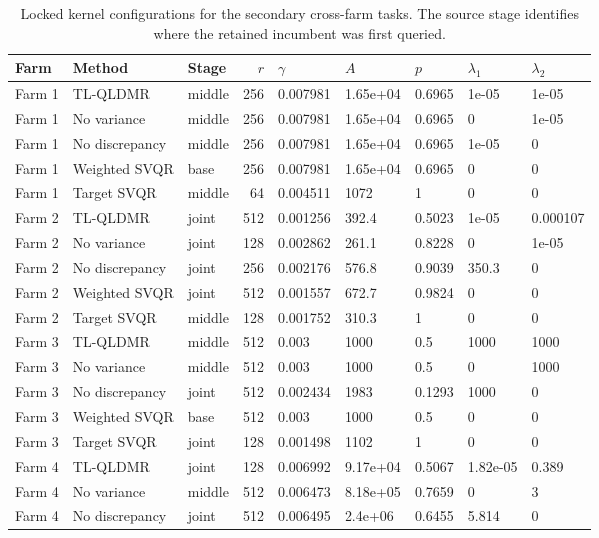 \begin{table}[pos=t,width=\FullWidth]
\centering
\color{blue}
\caption{Locked kernel configurations for the secondary cross-farm tasks. The source stage identifies where the retained incumbent was first queried.}
\label{tab:selection-v2-cross-kernel-configs}
\small
\setlength{\tabcolsep}{3pt}
\begin{tabular}{lllrlllll}
\toprule
Farm & Method & Stage & $r$ & $\gamma$ & $A$ & $p$ & $\lambda_1$ & $\lambda_2$ \\
\midrule
Farm 1 & TL-QLDMR & middle & 256 & 0.007981 & 1.65e+04 & 0.6965 & 1e-05 & 1e-05 \\
Farm 1 & No variance & middle & 256 & 0.007981 & 1.65e+04 & 0.6965 & 0 & 1e-05 \\
Farm 1 & No discrepancy & middle & 256 & 0.007981 & 1.65e+04 & 0.6965 & 1e-05 & 0 \\
Farm 1 & Weighted SVQR & base & 256 & 0.007981 & 1.65e+04 & 0.6965 & 0 & 0 \\
Farm 1 & Target SVQR & middle & 64 & 0.004511 & 1072 & 1 & 0 & 0 \\
Farm 2 & TL-QLDMR & joint & 512 & 0.001256 & 392.4 & 0.5023 & 1e-05 & 0.000107 \\
Farm 2 & No variance & joint & 128 & 0.002862 & 261.1 & 0.8228 & 0 & 1e-05 \\
Farm 2 & No discrepancy & joint & 256 & 0.002176 & 576.8 & 0.9039 & 350.3 & 0 \\
Farm 2 & Weighted SVQR & joint & 512 & 0.001557 & 672.7 & 0.9824 & 0 & 0 \\
Farm 2 & Target SVQR & middle & 128 & 0.001752 & 310.3 & 1 & 0 & 0 \\
Farm 3 & TL-QLDMR & middle & 512 & 0.003 & 1000 & 0.5 & 1000 & 1000 \\
Farm 3 & No variance & middle & 512 & 0.003 & 1000 & 0.5 & 0 & 1000 \\
Farm 3 & No discrepancy & joint & 512 & 0.002434 & 1983 & 0.1293 & 1000 & 0 \\
Farm 3 & Weighted SVQR & base & 512 & 0.003 & 1000 & 0.5 & 0 & 0 \\
Farm 3 & Target SVQR & joint & 128 & 0.001498 & 1102 & 1 & 0 & 0 \\
Farm 4 & TL-QLDMR & joint & 128 & 0.006992 & 9.17e+04 & 0.5067 & 1.82e-05 & 0.389 \\
Farm 4 & No variance & middle & 512 & 0.006473 & 8.18e+05 & 0.7659 & 0 & 3 \\
Farm 4 & No discrepancy & joint & 512 & 0.006495 & 2.4e+06 & 0.6455 & 5.814 & 0 \\

\end{tabular}
\end{table}
